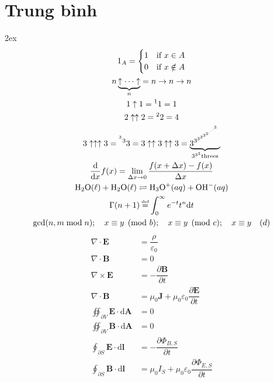 \documentclass[a4paper,12pt,notitlepage]{article}
\newcommand{\f}[2]{\dfrac{#1}{#2}}
\begin{document}
	\section{Trung bình}
	\openup 2ex
	\begin{gather}
		1_A = 
		\begin{cases}
			1 & \text{if } x \in A \\
			0 & \text{if } x \notin A
		\end{cases} \\	
		n \underbrace{\uparrow \cdots \uparrow}_n = n \rightarrow n \rightarrow n \\
		1 \uparrow 1 = {^1}1 = 1 \nonumber \\
		2 \uparrow \uparrow 2 = {^2}2 = 4 \nonumber \\
		3 \uparrow \uparrow \uparrow 3 = {^{^{^3}3}}3 %
		= 3 \uparrow \uparrow 3 \uparrow \uparrow 3 = \underbrace{3^{3^{3^{3^{3^{3^{.^{.^{.^{3}}}}}}}}}}_{3^{3^3} \text{threes}} \\
		\f{\mathrm{d}}{\mathrm{d} x} f(x) = \lim_{\Delta x \to 0} \f{f(x+\Delta x) - f(x)}{\Delta x} \\
		\mathrm{H_2O}(\ell) + \mathrm{H_2O}(\ell) \rightleftharpoons \mathrm{H_3O^+} (aq) + \mathrm{OH^-} (aq) \\
		\Gamma (n+1) \stackrel{\mathclap{\tiny\mbox{def}}}{=} \int_0^{\infty} e^{-t}t^n \mathrm{d} t \\
		\gcd(n,m \bmod n); \quad x \equiv y \pmod{b}; \quad x \equiv y \pmod{c}; \quad x \equiv y \quad (d)
	\end{gather}
	\begin{align}
		\nabla \cdot \mathbf{E} &= \f{\rho}{\varepsilon_0} \nonumber \\
		\nabla \cdot \mathbf{B} &= 0 \nonumber \\
		\nabla \times \mathbf{E} &= -\f{\partial \mathbf{B}}{\partial t} \nonumber \\
		\nabla \cdot \mathbf{B} &= \mu_0 \mathbf{J} + \mu_0 \varepsilon_0 \f{\partial \mathbf{E}}{\partial t} \\
		\oiint_{\partial V} \mathbf{E} \cdot \mathrm{d} \mathbf{A} &= 0 \nonumber \\
		\oiint_{\partial V} \mathbf{B} \cdot \mathrm{d} \mathbf{A}  &= 0 \nonumber \\
		\oint_{\partial S} \mathbf{E} \cdot \mathrm{d} \mathbf{l} &= -\f{\partial \Phi_{B,S}}{\partial t} \nonumber \\
		\oint_{\partial S} \mathbf{B} \cdot \mathrm{d} \mathbf{l} &= \mu_0 I_S + \mu_0 \varepsilon_0 \f{\partial \Phi_{E,S}}{\partial t}
	\end{align}
\end{document}
